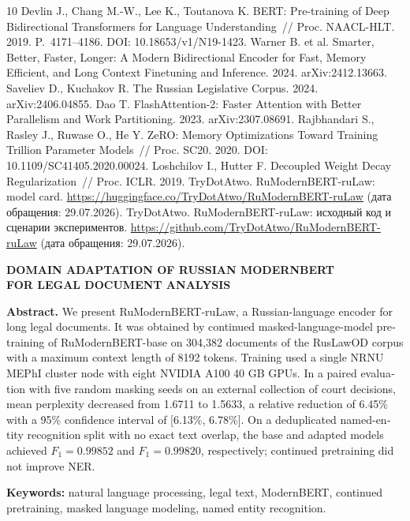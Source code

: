 \documentclass[12pt,a4paper]{article}
\begin{document}
\begin{thebibliography}{10}
 Devlin J., Chang M.-W., Lee K., Toutanova K. BERT: Pre-training of Deep Bidirectional Transformers for Language Understanding~// Proc. NAACL-HLT. 2019. P.~4171--4186. DOI: 10.18653/v1/N19-1423.
 Warner B. et al. Smarter, Better, Faster, Longer: A Modern Bidirectional Encoder for Fast, Memory Efficient, and Long Context Finetuning and Inference. 2024. arXiv:2412.13663.
 Saveliev D., Kuchakov R. The Russian Legislative Corpus. 2024. arXiv:2406.04855.
 Dao T. FlashAttention-2: Faster Attention with Better Parallelism and Work Partitioning. 2023. arXiv:2307.08691.
 Rajbhandari S., Rasley J., Ruwase O., He Y. ZeRO: Memory Optimizations Toward Training Trillion Parameter Models~// Proc. SC20. 2020. DOI: 10.1109/SC41405.2020.00024.
 Loshchilov I., Hutter F. Decoupled Weight Decay Regularization~// Proc. ICLR. 2019.
 TryDotAtwo. RuModernBERT-ruLaw: model card. \url{https://huggingface.co/TryDotAtwo/RuModernBERT-ruLaw} (дата обращения: 29.07.2026).
 TryDotAtwo. RuModernBERT-ruLaw: исходный код и сценарии экспериментов. \url{https://github.com/TryDotAtwo/RuModernBERT-ruLaw} (дата обращения: 29.07.2026).
\end{thebibliography}

\newpage
\begin{english}
\begin{center}\textbf{\Large DOMAIN ADAPTATION OF RUSSIAN MODERNBERT\\FOR LEGAL DOCUMENT ANALYSIS}\end{center}
\textbf{Abstract.} We present RuModernBERT-ruLaw, a Russian-language encoder for long legal documents. It was obtained by continued masked-language-model pretraining of RuModernBERT-base on 304,382 documents of the RusLawOD corpus with a maximum context length of 8192 tokens. Training used a single NRNU MEPhI cluster node with eight NVIDIA A100 40 GB GPUs. In a paired evaluation with five random masking seeds on an external collection of court decisions, mean perplexity decreased from 1.6711 to 1.5633, a relative reduction of 6.45\% with a 95\% confidence interval of [6.13\%, 6.78\%]. On a deduplicated named-entity recognition split with no exact text overlap, the base and adapted models achieved $F_1=0.99852$ and $F_1=0.99820$, respectively; continued pretraining did not improve NER.

\textbf{Keywords:} natural language processing, legal text, ModernBERT, continued pretraining, masked language modeling, named entity recognition.
\end{english}
\end{document}
